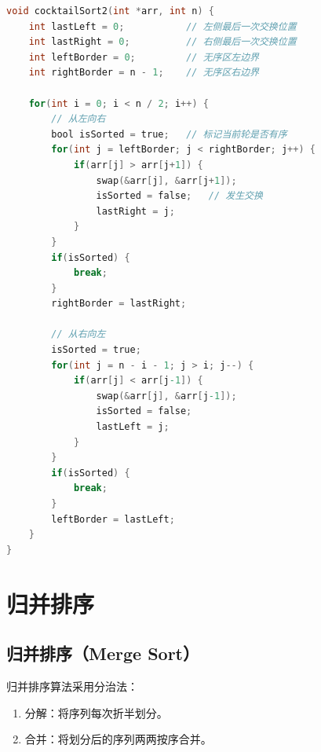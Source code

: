 \begin{lstlisting}[language=C]
void cocktailSort2(int *arr, int n) {
    int lastLeft = 0;           // 左侧最后一次交换位置
    int lastRight = 0;          // 右侧最后一次交换位置
    int leftBorder = 0;         // 无序区左边界
    int rightBorder = n - 1;    // 无序区右边界

    for(int i = 0; i < n / 2; i++) {
        // 从左向右
        bool isSorted = true;   // 标记当前轮是否有序
        for(int j = leftBorder; j < rightBorder; j++) {
            if(arr[j] > arr[j+1]) {
                swap(&arr[j], &arr[j+1]);
                isSorted = false;   // 发生交换
                lastRight = j;
            }
        }
        if(isSorted) {
            break;
        }
        rightBorder = lastRight;

        // 从右向左
        isSorted = true;
        for(int j = n - i - 1; j > i; j--) {
            if(arr[j] < arr[j-1]) {
                swap(&arr[j], &arr[j-1]);
                isSorted = false;
                lastLeft = j;
            }
        }
        if(isSorted) {
            break;
        }
        leftBorder = lastLeft;
    }
}
\end{lstlisting}

\newpage

\section{归并排序}

\subsection{归并排序（Merge Sort）}

归并排序算法采用分治法：

\begin{enumerate}
	\item 分解：将序列每次折半划分。
	\item 合并：将划分后的序列两两按序合并。
\end{enumerate}

